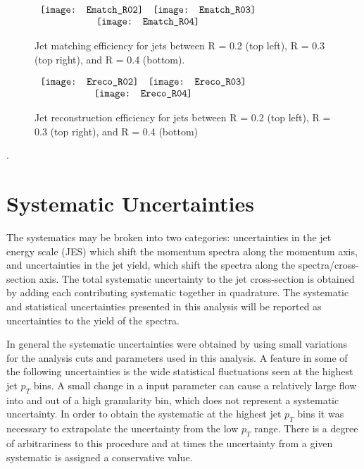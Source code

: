 \begin{figure*}[t!]
$\begin{array}{rl}
    \texttt{[image: Ematch\_R02]} &
    \texttt{[image: Ematch\_R03]}\\
    \multicolumn{2}{c}{\texttt{[image: Ematch\_R04]}}
\end{array}$
\caption[Jet reconstruction efficiency for jets between R = 0.2 and R = 0.4. ]{\label{fig:JetMatcheff}Jet matching efficiency for jets between R = 0.2 (top left), R = 0.3 (top right), and R = 0.4 (bottom).}
\end{figure*}

\begin{figure*}[t!]
$\begin{array}{rl}
    \texttt{[image: Ereco\_R02]} &
    \texttt{[image: Ereco\_R03]}\\
    \multicolumn{2}{c}{\texttt{[image: Ereco\_R04]}}
\end{array}$
\caption[Jet reconstruction efficiency for jets between R = 0.2 and R = 0.4.]{\label{fig:JetRecoeff}Jet reconstruction efficiency for jets between R = 0.2 (top left), R = 0.3 (top right), and R = 0.4 (bottom)}
\end{figure*}


.

\section{Systematic Uncertainties}

The systematics may be broken into two categories: uncertainties in the jet energy scale (JES) which shift the momentum spectra along the momentum axis, and uncertainties in the jet yield, which shift the spectra along the spectra/cross-section axis.  The total systematic uncertainty to the jet cross-section is obtained by adding each contributing systematic together in quadrature.  The systematic and statistical uncertainties presented in this analysis will be reported as uncertainties to the yield of the spectra.  

In general the systematic uncertainties were obtained by using small variations for the analysis cuts and parameters used in this analysis.  A feature in some of the following uncertainties is the wide statistical fluctuations seen at the highest jet $p_{T}$ bins.  A small change in a input parameter can cause a relatively large flow into and out of a high granularity bin, which does not represent a systematic uncertainty.  In order to obtain the systematic at the highest jet $p_{T}$ bins it was necessary to extrapolate the uncertainty from the low $p_{T}$ range.  There is a degree of arbitrariness to this procedure and at times the uncertainty from a given systematic is assigned a conservative value.  

